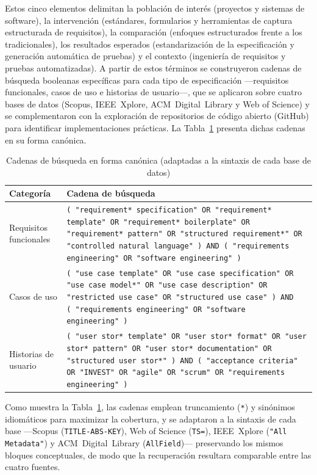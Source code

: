 \documentclass[10pt,journal,twoside,letterpaper]{IEEEtran}
\begin{document}
	Estos cinco elementos delimitan la población de interés (proyectos y sistemas de software), la intervención (estándares, formularios y herramientas de captura estructurada de requisitos), la comparación (enfoques estructurados frente a los tradicionales), los resultados esperados (estandarización de la especificación y generación automática de pruebas) y el contexto (ingeniería de requisitos y pruebas automatizadas). A partir de estos términos se construyeron cadenas de búsqueda booleanas específicas para cada tipo de especificación ---requisitos funcionales, casos de uso e historias de usuario---, que se aplicaron sobre cuatro bases de datos (Scopus, IEEE~Xplore, ACM~Digital~Library y Web of Science) y se complementaron con la exploración de repositorios de código abierto (GitHub) para identificar implementaciones prácticas. La Tabla~\ref{tab:cadenas} presenta dichas cadenas en su forma canónica.

	\begin{table}[!tb]
		\caption{Cadenas de búsqueda en forma canónica (adaptadas a la sintaxis de cada base de datos)}
		\label{tab:cadenas}
		\centering
		\footnotesize
		\begin{tabular}{@{}p{}p{}@{}}
			\toprule
			\textbf{Categoría} & \textbf{Cadena de búsqueda} \\
			\midrule
			Requisitos funcionales & \texttt{(\,"requirement* specification" OR "requirement* template" OR "requirement* boilerplate" OR "requirement* pattern" OR "structured requirement*" OR "controlled natural language"\,) AND (\,"requirements engineering" OR "software engineering"\,)} \\
			\addlinespace
			Casos de uso & \texttt{(\,"use case template" OR "use case specification" OR "use case model*" OR "use case description" OR "restricted use case" OR "structured use case"\,) AND (\,"requirements engineering" OR "software engineering"\,)} \\
			\addlinespace
			Historias de usuario & \texttt{(\,"user stor* template" OR "user stor* format" OR "user stor* pattern" OR "user stor* documentation" OR "structured user stor*"\,) AND (\,"acceptance criteria" OR "INVEST" OR "agile" OR "scrum" OR "requirements engineering"\,)} \\
			\bottomrule
		\end{tabular}
	\end{table}

	Como muestra la Tabla~\ref{tab:cadenas}, las cadenas emplean truncamiento (\texttt{*}) y sinónimos idiomáticos para maximizar la cobertura, y se adaptaron a la sintaxis de cada base ---Scopus (\texttt{TITLE-ABS-KEY}), Web of Science (\texttt{TS=}), IEEE~Xplore (\texttt{"All Metadata"}) y ACM~Digital~Library (\texttt{AllField})--- preservando los mismos bloques conceptuales, de modo que la recuperación resultara comparable entre las cuatro fuentes.
\end{document}
